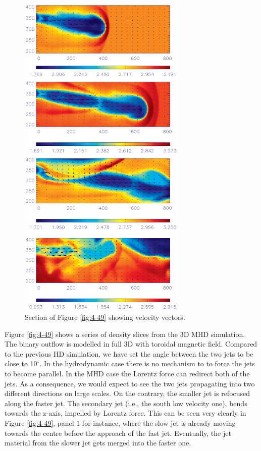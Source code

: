\documentclass{aa}
\begin{document}
\begin{figure}[t]
\centering
\includegraphics[width=8cm]{8609fig5.eps}
\caption{ 
Section of Figure \ref{fig:4-49} showing velocity vectors.
}
\label{fig:4-50}
\end{figure}



Figure \ref{fig:4-49} shows a series of density slices from the 3D MHD
simulation. The binary outflow is modelled in full 3D with toroidal magnetic field.
Compared to the previous HD simulation, 
we have set the angle between the two jets to 
be close to 10$^\circ$. 
In the hydrodynamic case there is no mechanism to to force the jets to become
parallel. In the MHD case the Lorentz force can redirect both of the jets.
As a consequence, we would expect to see the two jets
propagating into two different directions on large scales. On the contrary,
the smaller jet is refocused along the faster jet. 
The secondary jet (i.e., the south low velocity one), bends towards
 the z-axis, impelled by Lorentz force. 
 This can be seen very clearly in Figure \ref{fig:4-49}, panel 1 for instance,
 where the slow jet is already moving towards the centre before the approach of
 the fast jet.
Eventually, the jet material from the slower 
jet gets merged into the faster one.
\end{document}
